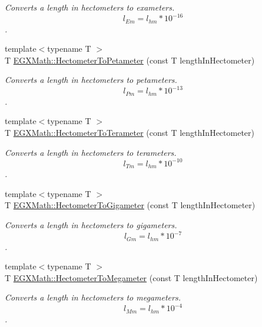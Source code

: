 \begin{DoxyCompactItemize}
\begin{DoxyCompactList}\small\item\em Converts a length in hectometers to exameters. \[ l_{Em}=l_{hm} * 10^{-16} \]. \end{DoxyCompactList}\item 
{\footnotesize template$<$typename T $>$ }\\T \mbox{\hyperlink{group___e_g_x_math-_conversions-_length_conversions-_hectometer-_s_i_ga212c05cda0b3776419e97ae7b3e0158a}{E\+G\+X\+Math\+::\+Hectometer\+To\+Petameter}} (const T length\+In\+Hectometer)
\begin{DoxyCompactList}\small\item\em Converts a length in hectometers to petameters. \[ l_{Pm}=l_{hm} * 10^{-13} \]. \end{DoxyCompactList}\item 
{\footnotesize template$<$typename T $>$ }\\T \mbox{\hyperlink{group___e_g_x_math-_conversions-_length_conversions-_hectometer-_s_i_ga12cec764ceb52e7120b503f8f12ed4a2}{E\+G\+X\+Math\+::\+Hectometer\+To\+Terameter}} (const T length\+In\+Hectometer)
\begin{DoxyCompactList}\small\item\em Converts a length in hectometers to terameters. \[ l_{Tm}=l_{hm} * 10^{-10} \]. \end{DoxyCompactList}\item 
{\footnotesize template$<$typename T $>$ }\\T \mbox{\hyperlink{group___e_g_x_math-_conversions-_length_conversions-_hectometer-_s_i_ga506846099a8b61bcc3d1cf761dc4cfc5}{E\+G\+X\+Math\+::\+Hectometer\+To\+Gigameter}} (const T length\+In\+Hectometer)
\begin{DoxyCompactList}\small\item\em Converts a length in hectometers to gigameters. \[ l_{Gm}=l_{hm} * 10^{-7} \]. \end{DoxyCompactList}\item 
{\footnotesize template$<$typename T $>$ }\\T \mbox{\hyperlink{group___e_g_x_math-_conversions-_length_conversions-_hectometer-_s_i_gab1a836041f9b5851f1b51fa4a09c6791}{E\+G\+X\+Math\+::\+Hectometer\+To\+Megameter}} (const T length\+In\+Hectometer)
\begin{DoxyCompactList}\small\item\em Converts a length in hectometers to megameters. \[ l_{Mm}=l_{hm} * 10^{-4} \]. \end{DoxyCompactList}\item 

\end{DoxyCompactItemize}
